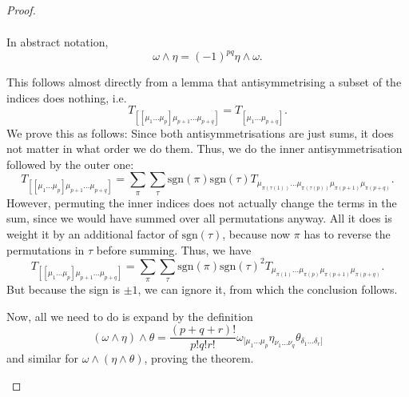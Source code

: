 \begin{proof}
\begin{parts}
\begin{align*}
	\end{align*}
	In abstract notation,
	\[
	\omega\wedge\eta = (-1)^{pq}\eta\wedge\omega
	.\] 
	\item This follows almost directly from a lemma that antisymmetrising a subset of the indices does nothing, i.e.
\[
	T_{[[\mu_1\dots \mu_p]\mu_{p+1}\dots\mu_{p+q}]}=T_{[\mu_1\dots \mu_{p+q}]}
.\] 
We prove this as follows: Since both antisymmetrisations are just sums, it does not matter in what order we do them. Thus, we do the inner antisymmetrisation followed by the outer one:
\[
	T_{[[\mu_1\dots \mu_p]\mu_{p+1}\dots\mu_{p+q}]}=\sum_\pi\sum_\tau \text{sgn}(\pi)\text{sgn}(\tau) T_{\mu_{\pi(\tau(1))}\dots\mu_{\pi(\tau(p))}\mu_{\pi(p+1)}\mu_{\pi(p+q)}}
.\] 
However, permuting the inner indices does not actually change the terms in the sum, since we would have summed over all permutations anyway. All it does is weight it by an additional factor of $\text{sgn}(\tau)$, because now $\pi$ has to reverse the permutations in $\tau$ before summing. Thus, we have
\[
	T_{[[\mu_1\dots \mu_p]\mu_{p+1}\dots\mu_{p+q}]}=\sum_\pi\sum_\tau \text{sgn}(\pi)\text{sgn}(\tau)^2 T_{\mu_{\pi(1)}\dots\mu_{\pi(p)}\mu_{\pi(p+1)}\mu_{\pi(p+q)}}
.\] 
But because the sign is $\pm 1$, we can ignore it, from which the conclusion follows.

Now, all we need to do is expand by the definition
\[
	(\omega\wedge\eta)\wedge\theta = \frac{(p+q+r)!}{p!q!r!}\omega_{[\mu_1\dots \mu_p}\eta_{\nu_1\dots \nu_q}\theta_{\delta_1\dots \delta_r]}
\] 
and similar for $\omega\wedge(\eta\wedge\theta) $, proving the theorem.
\end{parts}
\end{proof}

